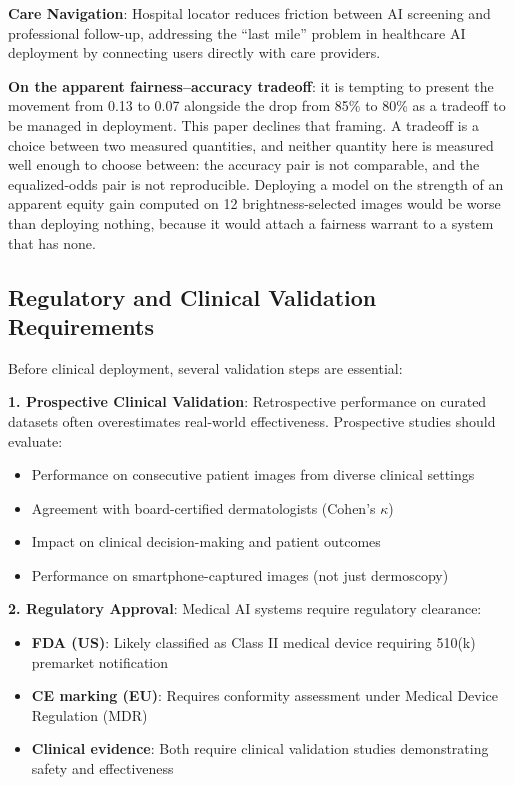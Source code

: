 \documentclass[ai,article,submit,pdftex,moreauthors]{Definitions/mdpi}
\begin{document}
\textbf{Care Navigation}: Hospital locator reduces friction between AI screening and professional follow-up, addressing the ``last mile'' problem in healthcare AI deployment by connecting users directly with care providers.

\textbf{On the apparent fairness--accuracy tradeoff}: it is tempting to present the movement from 0.13 to 0.07 alongside the drop from 85\% to 80\% as a tradeoff to be managed in deployment. This paper declines that framing. A tradeoff is a choice between two measured quantities, and neither quantity here is measured well enough to choose between: the accuracy pair is not comparable, and the equalized-odds pair is not reproducible. Deploying a model on the strength of an apparent equity gain computed on 12 brightness-selected images would be worse than deploying nothing, because it would attach a fairness warrant to a system that has none.

\subsection{Regulatory and Clinical Validation Requirements}

Before clinical deployment, several validation steps are essential:

\textbf{1. Prospective Clinical Validation}: Retrospective performance on curated datasets often overestimates real-world effectiveness. Prospective studies should evaluate:
\begin{itemize}[leftmargin=*, itemsep=2pt]
    \item Performance on consecutive patient images from diverse clinical settings
    \item Agreement with board-certified dermatologists (Cohen's $\kappa$)
    \item Impact on clinical decision-making and patient outcomes
    \item Performance on smartphone-captured images (not just dermoscopy)
\end{itemize}

\textbf{2. Regulatory Approval}: Medical AI systems require regulatory clearance:
\begin{itemize}[leftmargin=*, itemsep=2pt]
    \item \textbf{FDA (US)}: Likely classified as Class II medical device requiring 510(k) premarket notification
    \item \textbf{CE marking (EU)}: Requires conformity assessment under Medical Device Regulation (MDR)
    \item \textbf{Clinical evidence}: Both require clinical validation studies demonstrating safety and effectiveness
\end{itemize}
\end{document}
